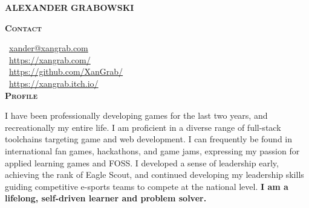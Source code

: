 \documentclass[11pt, a4paper]{article}
\newcommand{\headleft}[1]{\vspace*{3ex}\textsc{\textbf{#1}}\par%
    \vspace*{-1.5ex}\hrulefill\par\vspace*{0.2ex}}
\begin{document}
\setlength{\topskip}{0pt}
\setlength{\parindent}{0pt}
\setlength{\parskip}{0pt}
\setlength{\fboxsep}{0pt}
\pagestyle{empty}
\raggedbottom

\begin{minipage}[t]{0.33\textwidth} %
\colorbox{cvblue}{\begin{minipage}[t][5mm][t]{\textwidth}\null\hfill\null\end{minipage}}

\vspace{-.2ex} %
\colorbox{cvblue!90}{\color{white}  %
\textwidth\relax%
\begin{minipage}[t][293mm][t]{0.82\textwidth}
\raggedright
\vspace*{2.0ex}

\begin{center}
    \Huge \textbf{ALEXANDER}\vspace{0.5ex}
    \textbf{GRABOWSKI} \normalsize 
\end{center}

\vspace*{-2.5ex} 

\headleft{Contact}
\faEnvelope\ \href{mailto:xander@xangrab.com}{xander@xangrab.com} \\[0.4ex]

\faGlobe\ \href{https://xangrab.com/}{https://xangrab.com/} \\[0.4ex]

\faGithub\ \href{https://github.com/XanGrab/}{https://github.com/XanGrab/} \\[0.4ex]

\faItchIo\ \href{https://xangrab.itch.io/}{https://xangrab.itch.io/} \\[0.4ex]


\headleft{Profile}
I have been professionally developing games for the last two years, and recreationally my entire life. I am proficient in a diverse range of full-stack toolchains targeting game and web development. I can frequently be found in international fan games, hackathons, and game jams, expressing my passion for applied learning games and FOSS. I developed a sense of leadership early, achieving the rank of Eagle Scout, and continued developing my leadership skills guiding competitive e-sports teams to compete at the national level. \textbf{I am a lifelong, self-driven learner and problem solver.}


\end{minipage}}
\end{minipage}
\end{document}
